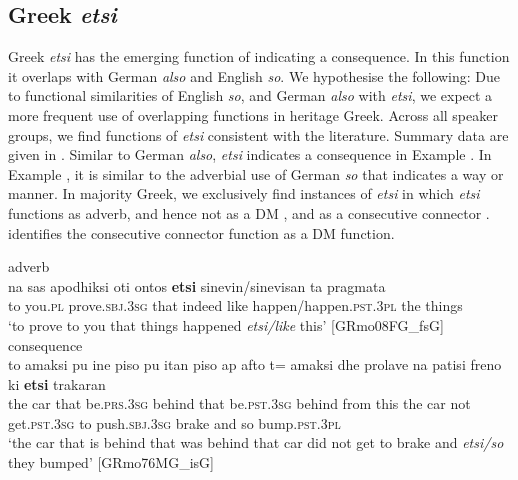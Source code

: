 \documentclass[output=paper,colorlinks,citecolor=brown]{langscibook}
\begin{document}
\subsection{Greek \emph{etsi}}
\label{sec:sub:labrenzetal:Greek_etsi}
\largerpage
Greek \textit{etsi} has the emerging function of indicating a consequence. In this function it overlaps with German \textit{also} and English \textit{so}. We hypothesise the following:
Due to functional similarities of English \textit{so}, and German \textit{also} with \textit{etsi}, we expect a more frequent use of overlapping functions in heritage Greek.
Across all speaker groups, we find functions of \textit{etsi} consistent with the literature. Summary data are given in . Similar to German \textit{also}, \textit{etsi} indicates a consequence in Example . In Example , it is similar to the adverbial use of German \textit{so} that indicates a way or manner. In majority Greek, we exclusively find instances of \textit{etsi} in which \textit{etsi} functions as adverb, and hence not as a DM , and as a consecutive connector . \citet{tsampoukas_grammaticalization_2015} identifies the consecutive connector function as a DM function. 

\ea adverb \label{ex:labrenzetal:24} \\
\gll na sas apodhiksi oti ontos \textbf{etsi} sinevin/sinevisan ta pragmata \\ to you.\textsc{pl} prove.\textsc{sbj.3sg} that indeed like happen/happen.\textsc{pst.3pl} the things\\
\glt ‘to prove to you that things happened \textit{etsi/like} this’ \hfill[GRmo08FG\_fsG]
\ex consequence \label{ex:labrenzetal:25} \\
\gll to amaksi pu ine piso pu itan piso ap afto t= amaksi dhe prolave na patisi freno ki \textbf{etsi} trakaran  \\ the car that be.\textsc{prs.3sg} behind that be.\textsc{pst.3sg} behind from this the car not get.\textsc{pst.3sg} to push.\textsc{sbj.3sg} brake and so bump.\textsc{pst.3pl}\\
\glt ‘the car that is behind that was behind that car did not get to brake and \textit{etsi/so} they bumped’  \hfill[GRmo76MG\_isG]
\z
\end{document}
